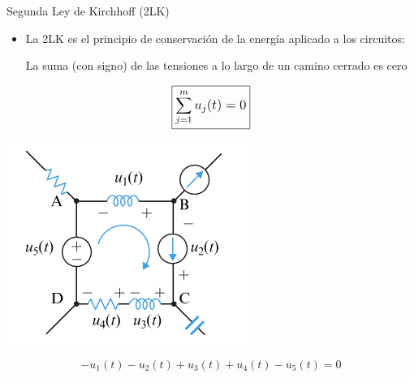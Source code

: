 \documentclass[aspectratio=169, xcolor={usenames,svgnames,dvipsnames}]{beamer}
\begin{document}
\begin{frame}{Segunda Ley de Kirchhoff (2LK)}
    \begin{itemize}
        \item La \alert{2LK} es el principio de \alert{conservación de la energía} aplicado a los circuitos:
        \vspace{2mm}
        
        La suma (con signo) de las tensiones a lo largo de un camino cerrado es cero        
    \end{itemize}
    \vspace{2mm}
    \begin{equation*}
            \large{\boxed{\sum_{j=1}^m u_j(t)=0}}
        \end{equation*}
    
    \begin{center}
        \includegraphics[height=0.4\textheight]{../figs/LKV_FM.pdf}
    \end{center}
    \[
        - u_1 (t) - u_2 (t) + u_3(t) + u_4 (t) - u_5 (t)    = 0
    \]

\end{frame}

\end{document}
